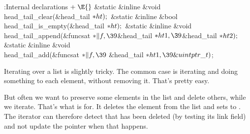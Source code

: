 \Y\B\4:Internal declarations\X${}\mathrel+\E{}$\6
\&{static} \&{inline} \&{void} \\{head\_tail\_clear}(\&{head\_tail} ${}{*}%
\\{ht});{}$\6
\&{static} \&{inline} \&{bool} \\{head\_tail\_is\_empty}(\&{head\_tail} ${}{*}%
\\{ht});{}$\6
\&{static} \&{inline} \&{void} \\{head\_tail\_append}(\&{funcsat} ${}{*}\|f,%
\39{}$\&{head\_tail} ${}{*}\\{ht1},\39{}$\&{head\_tail} ${}{*}\\{ht2});{}$\6
\&{static} \&{inline} \&{void} \\{head\_tail\_add}(\&{funcsat} ${}{*}\|f,\39{}$%
\&{head\_tail} ${}{*}\\{ht1},\39\&{uintptr\_t}){}$;\par
\fi

Iterating over a  list is slightly tricky. The common
case is
iterating and doing something to each element, without removing it. That's
pretty easy.

But often we want to preserve some elements in the list and delete others,
while
we iterate. That's what  is for. It deletes the %
element from the list and sets  to \PB{$\NULL$}. The
iterator can therefore
detect that  has been deleted (by testing its link field) and not
update
the  pointer when that happens.

